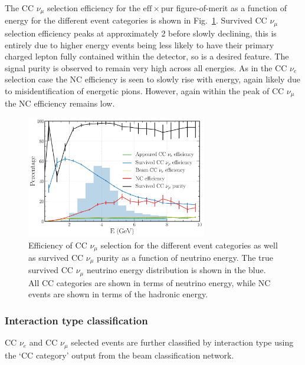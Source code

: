The CC $\nu_{\mu}$ selection efficiency for the $\mathrm{eff}\times\mathrm{pur}$ figure-of-merit
as a function of energy for the different event categories is shown in
Fig.~\ref{fig:final_numu_hists}. Survived CC $\nu_{\mu}$ selection efficiency peaks at
approximately \unit{2}{\GeV} before slowly declining, this is entirely due to higher energy events
being less likely to have their primary charged lepton fully contained within the detector, so is
a desired feature. The signal purity is observed to remain very high across all energies. As in
the CC $\nu_{e}$ selection case the NC efficiency is seen to slowly rise with energy, again likely
due to misidentification of energetic pions. However, again within the peak of CC $\nu_{\mu}$ the
NC efficiency remains low.

\begin{figure} %
    \includegraphics[width=0.7\textwidth]{diagrams/6-cvn/chipsnet/final_numu_hists.pdf}
    \caption[Efficiency of CC $\nu_{\mu}$ selection as a function of energy.]
    {Efficiency of CC $\nu_{\mu}$ selection for the different event categories as well as survived
        CC $\nu_{\mu}$ purity as a function of neutrino energy. The true survived CC $\nu_{\mu}$
        neutrino energy distribution is shown in the blue. All CC categories are shown in terms of
        neutrino energy, while NC events are shown in terms of the hadronic energy.}
    \label{fig:final_numu_hists}
\end{figure}

\subsubsection*{Interaction type classification} %

CC $\nu_{e}$ and CC $\nu_{\mu}$ selected events are further classified by interaction type using
the `CC category' output from the beam classification network.

